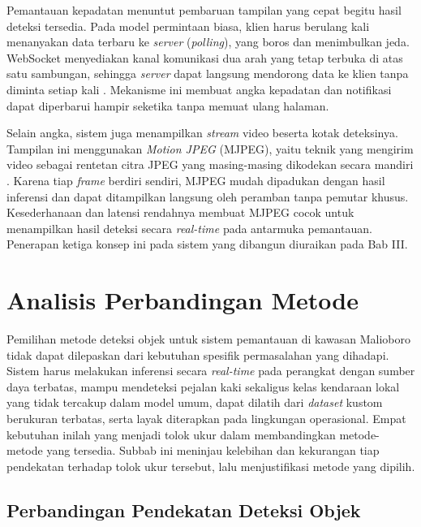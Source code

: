 Pemantauan kepadatan menuntut pembaruan tampilan yang cepat begitu hasil deteksi tersedia. 
Pada model permintaan biasa, klien harus berulang kali menanyakan data terbaru ke \textit{server} 
(\textit{polling}), yang boros dan menimbulkan jeda. WebSocket menyediakan kanal komunikasi 
dua arah yang tetap terbuka di atas satu sambungan, sehingga \textit{server} dapat langsung mendorong 
data ke klien tanpa diminta setiap kali \cite{fette2011websocket}. Mekanisme ini membuat angka 
kepadatan dan notifikasi dapat diperbarui hampir seketika tanpa memuat ulang halaman.

Selain angka, sistem juga menampilkan \textit{stream} video beserta kotak deteksinya. 
Tampilan ini menggunakan \textit{Motion JPEG} (MJPEG), yaitu teknik yang mengirim video 
sebagai rentetan citra JPEG yang masing-masing dikodekan secara mandiri \cite{wallace1992jpeg}. 
Karena tiap \textit{frame} berdiri sendiri, MJPEG mudah dipadukan dengan hasil inferensi dan 
dapat ditampilkan langsung oleh peramban tanpa pemutar khusus. Kesederhanaan dan latensi 
rendahnya membuat MJPEG cocok untuk menampilkan hasil deteksi secara \textit{real-time} pada 
antarmuka pemantauan. Penerapan ketiga konsep ini pada sistem yang dibangun diuraikan pada 
Bab III.

\section{Analisis Perbandingan Metode}

\label{sec:analisis_perbandingan}

Pemilihan metode deteksi objek untuk sistem pemantauan di kawasan Malioboro tidak dapat 
dilepaskan dari kebutuhan spesifik permasalahan yang dihadapi. Sistem harus melakukan 
inferensi secara \textit{real-time} pada perangkat dengan sumber daya terbatas, mampu 
mendeteksi pejalan kaki sekaligus kelas kendaraan lokal yang tidak tercakup dalam model 
umum, dapat dilatih dari \textit{dataset} kustom berukuran terbatas, serta layak 
diterapkan pada lingkungan operasional. Empat kebutuhan inilah yang menjadi tolok ukur 
dalam membandingkan metode-metode yang tersedia. Subbab ini meninjau kelebihan dan 
kekurangan tiap pendekatan terhadap tolok ukur tersebut, lalu menjustifikasi metode yang 
dipilih.

\subsection{Perbandingan Pendekatan Deteksi Objek}
\label{subsec:perbandingan_pendekatan}

